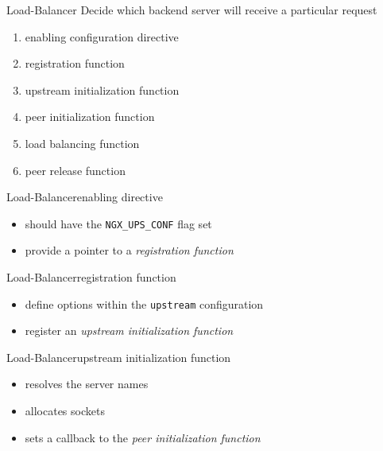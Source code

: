 \documentclass{beamer}
\begin{document}
\begin{frame}{Load-Balancer}
Decide which backend server will receive a particular request
\begin{enumerate}
 \item enabling configuration directive
 \item registration function
 \item upstream initialization function
 \item peer initialization function
 \item load balancing function
 \item peer release function
\end{enumerate}
\end{frame}

\begin{frame}[fragile]{Load-Balancer}{enabling directive}
\begin{itemize}
 \item should have the \verb|NGX_UPS_CONF| flag set
 \item provide a pointer to a \emph{registration function}
\end{itemize}
\end{frame}

\begin{frame}[fragile]{Load-Balancer}{registration function}
\begin{itemize}
 \item define options within the \verb|upstream| configuration
 \item register an \emph{upstream initialization function}
\end{itemize}
\end{frame}

\begin{frame}{Load-Balancer}{upstream initialization function}
\begin{itemize}
 \item resolves the server names
 \item allocates sockets
 \item sets a callback to the \emph{peer initialization function}
\end{itemize}
\end{frame}
\end{document}
